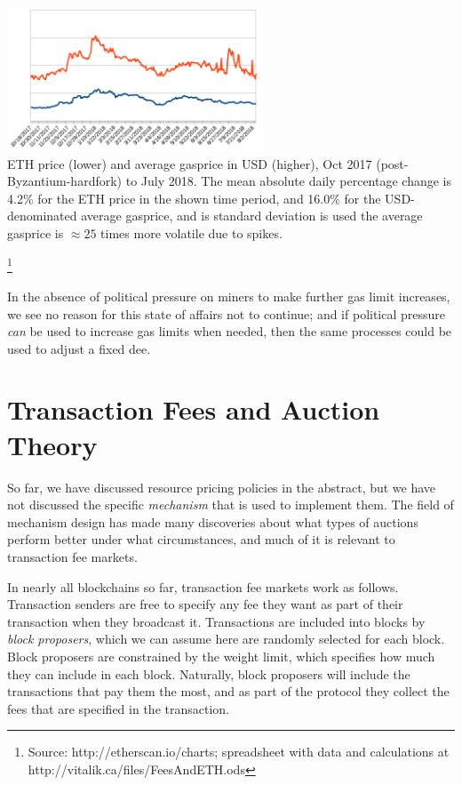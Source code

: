 \documentclass[12pt, final]{article}
\begin{document}
\begin{center}
\includegraphics[width=3in]{PriceAndFees.png} \\
\scriptsize{ETH price (lower) and average gasprice in USD (higher), Oct 2017 (post-Byzantium-hardfork) to July 2018. The mean absolute daily percentage change is 4.2\% for the ETH price in the shown time period, and 16.0\% for the USD-denominated average gasprice, and is standard deviation is used the average gasprice is $\approx 25$ times more volatile due to spikes.}

\footnote{Source: http://etherscan.io/charts; spreadsheet with data and calculations at http://vitalik.ca/files/FeesAndETH.ods}
\end{center}

In the absence of political pressure on miners to make further gas limit increases, we see no reason for this state of affairs not to continue; and if political pressure \emph{can} be used to increase gas limits when needed, then the same processes could be used to adjust a fixed dee.

\section{Transaction Fees and Auction Theory}

So far, we have discussed resource pricing policies in the abstract, but we have not discussed the specific \emph{mechanism} that is used to implement them. The field of mechanism design has made many discoveries about what types of auctions perform better under what circumstances, and much of it is relevant to transaction fee markets.

In nearly all blockchains so far, transaction fee markets work as follows. Transaction senders are free to specify any fee they want as part of their transaction when they broadcast it. Transactions are included into blocks by \emph{block proposers}, which we can assume here are randomly selected for each block. Block proposers are constrained by the weight limit, which specifies how much they can include in each block. Naturally, block proposers will include the transactions that pay them the most, and as part of the protocol they collect the fees that are specified in the transaction.
\end{document}
